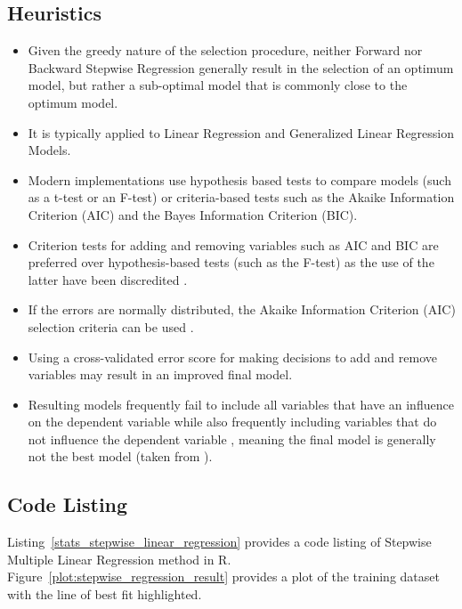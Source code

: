 \subsection{Heuristics}

\begin{itemize}
	\item Given the greedy nature of the selection procedure, neither Forward nor Backward Stepwise Regression generally result in the selection of an optimum model, but rather a sub-optimal model that is commonly close to the optimum model.
	\item It is typically applied to Linear Regression and Generalized Linear Regression Models.
	\item Modern implementations use hypothesis based tests to compare models (such as a t-test or an F-test) or criteria-based tests such as the Akaike Information Criterion (AIC) and the Bayes Information Criterion (BIC).
	\item Criterion tests for adding and removing variables such as AIC and BIC are preferred over hypothesis-based tests (such as the F-test) as the use of the latter have been discredited \cite{Pope1972, Wilkinson1979}.
	\item If the errors are normally distributed, the Akaike Information Criterion (AIC) selection criteria can be used \cite{Akaike1973}.
	\item Using a cross-validated error score for making decisions to add and remove variables may result in an improved final model.
	\item Resulting models frequently fail to include all variables that have an influence on the dependent variable while also frequently including variables that do not influence the dependent variable \cite{Derksen1992}, meaning the final model is generally not the best model \cite{Miller1984} (taken from \cite{Mundry2009}).
\end{itemize}

\subsection{Code Listing}
Listing~\ref{stats_stepwise_linear_regression} provides a code listing of Stepwise Multiple Linear Regression method in R. Figure~\ref{plot:stepwise_regression_result} provides a plot of the training dataset with the line of best fit highlighted.

